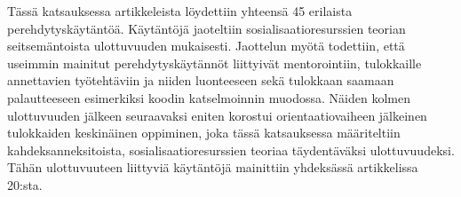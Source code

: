 \documentclass[utf8]{gradu3}
\begin{document}
Tässä katsauksessa artikkeleista löydettiin yhteensä 45 erilaista perehdytyskäytäntöä. Käytäntöjä jaoteltiin sosialisaatioresurssien teorian seitsemäntoista ulottuvuuden mukaisesti. Jaottelun myötä todettiin, että useimmin mainitut perehdytyskäytännöt liittyivät mentorointiin, tulokkaille annettavien työtehtäviin ja niiden luonteeseen sekä tulokkaan saamaan palautteeseen esimerkiksi koodin katselmoinnin muodossa. Näiden kolmen ulottuvuuden jälkeen seuraavaksi eniten korostui orientaatiovaiheen jälkeinen tulokkaiden keskinäinen oppiminen, joka tässä katsauksessa määriteltiin kahdeksanneksitoista, sosialisaatioresurssien teoriaa täydentäväksi ulottuvuudeksi. Tähän ulottuvuuteen liittyviä käytäntöjä mainittiin yhdeksässä artikkelissa 20:sta.

\printbibliography
\end{document}
